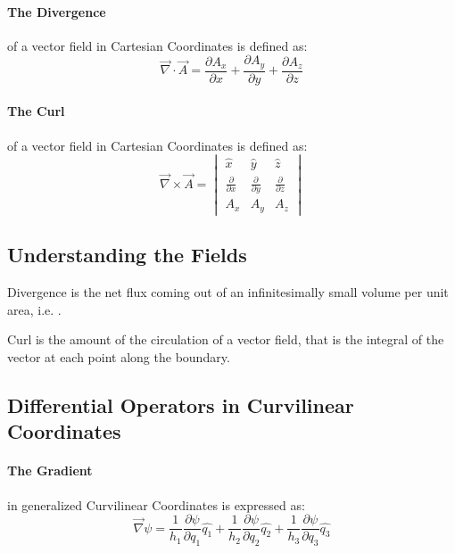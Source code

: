 \paragraph{The Divergence} of a vector field in Cartesian Coordinates is defined as:
\begin{equation}
    \vec{\nabla} \cdot \vec{A} = \frac{\partial A_{x}}{\partial x} + \frac{\partial A_{y}}{\partial y} + \frac{\partial A_{z}}{\partial z}
\end{equation}

\paragraph{The Curl} of a vector field in Cartesian Coordinates is defined as:
\begin{equation}
    \vec{\nabla} \times \vec{A} = 
    \begin{vmatrix}
        \hat{x} & \hat{y} & \hat{z} \\
        \frac{\partial}{\partial x} & \frac{\partial}{\partial y} & \frac{\partial}{\partial z} \\
        A_x & A_y & A_z
    \end{vmatrix} 
\end{equation}


\subsection{Understanding the Fields}

Divergence is the net flux coming out of an infinitesimally small volume per unit area, i.e. .

Curl is the amount of the circulation of a vector field, that is the integral of the vector at each point along the boundary.


\subsection{Differential Operators in Curvilinear Coordinates}

\paragraph{The Gradient} in generalized Curvilinear Coordinates is expressed as:
\begin{equation}
    \vec{\nabla} \psi = \frac{1}{h_1} \frac{\partial \psi}{\partial q_1} \hat{q_1} + \frac{1}{h_2} \frac{\partial \psi}{\partial q_2} \hat{q_2} + \frac{1}{h_3} \frac{\partial \psi}{\partial q_3} \hat{q_3}
\end{equation}

